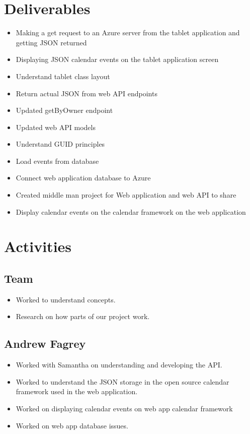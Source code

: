\documentclass{article}
\begin{document}
{\section*{Deliverables}
\begin{itemize}
\item Making a get request to an Azure server from the tablet application and getting JSON returned
\item Displaying JSON calendar events on the tablet application screen
\item Understand tablet class layout
\item Return actual JSON from web API endpoints
\item Updated getByOwner endpoint
\item Updated web API models
\item Understand GUID principles 
\item Load events from database
\item Connect web application database to Azure
\item Created middle man project for Web application and web API to share
\item Display calendar events on the calendar framework on the web application
\end{itemize}

\section*{Activities}
\subsection*{Team}
\begin{itemize}
\item Worked to understand concepts.
\item Research on how parts of our project work.
\end{itemize}

\subsection*{Andrew Fagrey}
\begin{itemize}
\item Worked with Samantha on understanding and developing the API.
\item Worked to understand the JSON storage in the open source calendar framework used in the web application.
\item Worked on displaying calendar events on web app calendar framework
\item Worked on web app database issues.
\end{itemize}

}
\end{document}
